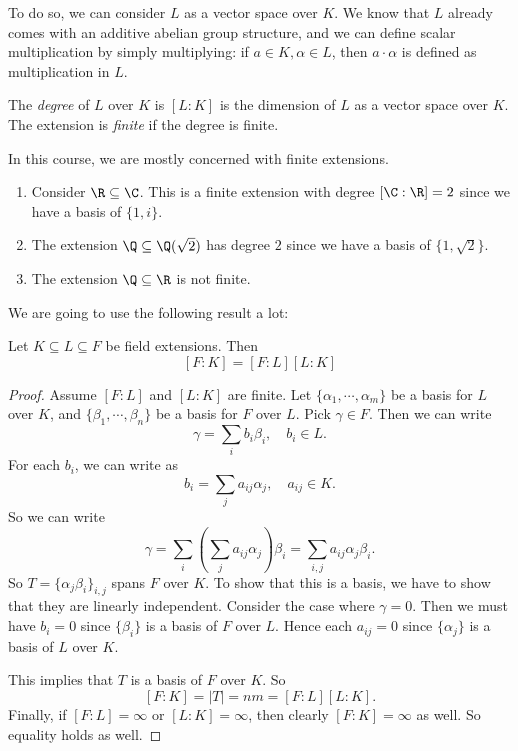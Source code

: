 \documentclass[a4paper]{article}
\begin{document}
To do so, we can consider $L$ as a vector space over $K$. We know that $L$ already comes with an additive abelian group structure, and we can define scalar multiplication by simply multiplying: if $a\in K, \alpha\in L$, then $a\cdot \alpha$ is defined as multiplication in $L$.

\begin{defi}
  The \emph{degree} of $L$ over $K$ is $[L:K]$ is the dimension of $L$ as a vector space over $K$. The extension is \emph{finite} if the degree is finite.
\end{defi}
In this course, we are mostly concerned with finite extensions.

\begin{eg}\leavevmode
  \begin{enumerate}
    \item Consider $\R\subseteq \C$. This is a finite extension with degree $[\C:\R] = 2$ since we have a basis of $\{1, i\}$.
    \item The extension $\Q\subseteq \Q(\sqrt{2})$ has degree $2$ since we have a basis of $\{1, \sqrt{2}\}$.
    \item The extension $\Q\subseteq \R$ is not finite.
  \end{enumerate}
\end{eg}

We are going to use the following result a lot:
\begin{thm}
  Let $K\subseteq L \subseteq F$ be field extensions. Then
  \[
    [F:K] = [F:L][L:K]
  \]
\end{thm}

\begin{proof}
  Assume $[F:L]$ and $[L:K]$ are finite. Let $\{\alpha_1, \cdots, \alpha_m\}$ be a basis for $L$ over $K$, and $\{\beta_1, \cdots, \beta_n\}$ be a basis for $F$ over $L$. Pick $\gamma \in F$. Then we can write
  \[
    \gamma = \sum_i b_i \beta_i,\quad b_i\in L.
  \]
  For each $b_i$, we can write as
  \[
    b_i = \sum_j a_{ij}\alpha_{j},\quad a_{ij}\in K.
  \]
  So we can write
  \[
    \gamma = \sum_i \left(\sum_j a_{ij}\alpha_j\right)\beta_i = \sum_{i, j} a_{ij}\alpha_j \beta_i.
  \]
  So $T = \{\alpha_j\beta_i\}_{i, j}$ spans $F$ over $K$. To show that this is a basis, we have to show that they are linearly independent. Consider the case where $\gamma = 0$. Then we must have $b_i = 0$ since $\{\beta_i\}$ is a basis of $F$ over $L$. Hence each $a_{ij} = 0$ since $\{\alpha_j\}$ is a basis of $L$ over $K$.

  This implies that $T$ is a basis of $F$ over $K$. So
  \[
    [F:K] = |T| = nm = [F:L][L:K].
  \]
  Finally, if $[F:L] = \infty$ or $[L:K] = \infty$, then clearly $[F:K] = \infty$ as well. So equality holds as well.
\end{proof}
\end{document}
